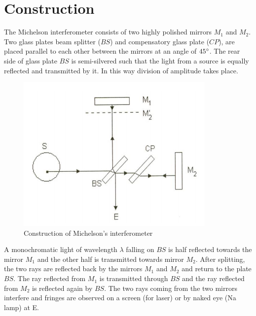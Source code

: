 \documentclass{article}
\begin{document}
\section{Construction}
\noindent
The Michelson interferometer consists of two highly polished mirrors $M_1$ and $M_2$. Two glass plates beam splitter ($BS$) and compensatory glass plate ($CP$), are placed parallel to each 
other between the mirrors at an angle of $45\degree$. The rear side of glass plate $BS$ is semi-silvered such that the light from a source is equally reflected and transmitted by it. In this way division of amplitude takes place.
\begin{figure}[h!]
    \centering
    \includegraphics{Figures/Construction of michelson intef.png}
    \caption{Construction of Michelson's interferometer}
    \label{fig:construction}
\end{figure}
\par
\noindent
A monochromatic light of wavelength $\lambda$ falling on $BS$ is half reflected towards the mirror $M_1$ and the other half is transmitted towards mirror $M_2$. After splitting, the two rays are reflected back by the mirrors $M_1$ and $M_2$ and return to the plate $BS$. The ray reflected from $M_1$ is transmitted through $BS$ and the ray reflected from $M_2$ is reflected again by $BS$. The two rays coming from the two mirrors interfere and fringes are observed on a screen (for laser) or by naked eye (Na lamp) at E.
\end{document}
